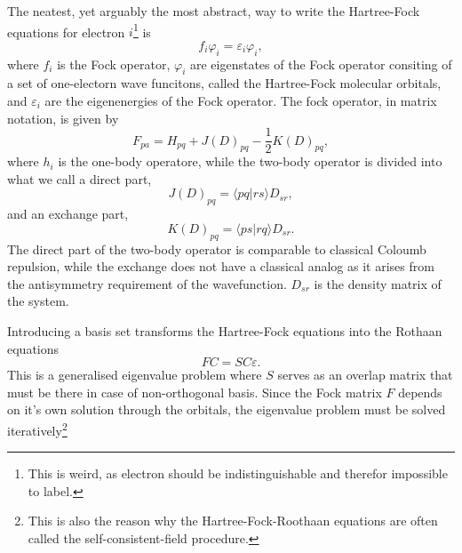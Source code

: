 \documentclass[
    a4paper, aps, twocolumn, floatfix, superscriptaddress,
    nofootinbib]{revtex4-1}
\newcommand{\1}{\mathds{1}}
\newcommand{\braket}[2]{\langle #1 \vert #2 \rangle}
\begin{document}

            The neatest, yet arguably the most abstract, way to write the Hartree-Fock
            equations for electron $i$\footnote{This is weird, as electron
            should be indistinguishable and therefor impossible to label.} is
            \begin{equation}
                f_i \varphi_i = \varepsilon_i \varphi_i,
            \end{equation}
            where $f_i$ is the Fock operator, $\varphi_i$ are eigenstates of the Fock
            operator consiting of a set of one-electorn wave funcitons, called the
            Hartree-Fock molecular orbitals, and $\varepsilon_i$ are the eigenenergies
            of the Fock operator. The fock operator, in matrix notation, is given by
            \begin{equation}
                F_{pa} = H_{pq} +  J(D)_{pq} - \frac{1}{2}K(D)_{pq},
            \end{equation}
            where $h_i$ is the one-body operatore, while the two-body operator is
            divided into what we call a direct part,
            \begin{equation}
                J(D)_{pq} = \braket{pq}{rs}D_{sr},
            \end{equation}
            and an exchange part,
            \begin{equation}
                K(D)_{pq} = \braket{ps}{rq}D_{sr}.
            \end{equation}
            The direct part of the two-body operator is comparable to classical Coloumb
            repulsion, while the exchange does not have a classical analog as it arises
            from the antisymmetry requirement of the wavefunction. $D_{sr}$ is the
            density matrix of the system.

            Introducing a basis set transforms the Hartree-Fock equations into the Rothaan
            equations
            \begin{equation}
                FC = SC\varepsilon.
            \end{equation}
            This is a generalised eigenvalue problem where $S$ serves as an overlap matrix
            that must be there in case of non-orthogonal basis. Since the Fock matrix $F$
            depends on it's own solution through the orbitals, the eigenvalue problem must
            be solved iteratively\footnote{This is also the reason why the
            Hartree-Fock-Roothaan equations are often called the self-consistent-field
            procedure.}
\end{document}
